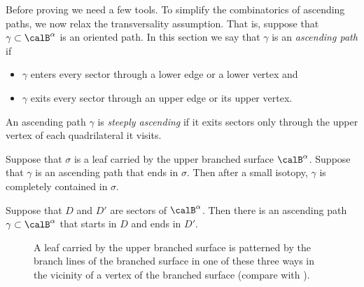 \documentclass[12pt]{amsart}
\begin{document}
Before proving  we need a few tools. To simplify the combinatorics of ascending paths, we now relax the transversality assumption. That is, suppose that $\gamma \subset \calB^\alpha$ is an oriented path. In this section we say that $\gamma$ is an \emph{ascending path} if 
\begin{itemize}
\item
$\gamma$ enters every sector through a lower edge or a lower vertex and 
\item
$\gamma$ exits every sector through an upper edge or its upper vertex.
\end{itemize}
An ascending path $\gamma$ is \emph{steeply ascending} if it exits sectors only through the upper vertex of each quadrilateral it visits. 

\begin{remark}
\label{Rem:Ascend}
Suppose that $\sigma$ is a leaf carried by the upper branched surface $\calB^\alpha$. Suppose that $\gamma$ is an ascending path that ends in $\sigma$. Then after a small isotopy, $\gamma$ is completely contained in $\sigma$.
\end{remark}

\begin{lemma}
\label{Lem:Transitive}
Suppose that $D$ and $D'$ are sectors of $\calB^\alpha$.  Then there is an ascending path $\gamma \subset \calB^\alpha$ that starts in $D$ and ends in $D'$.  
\end{lemma}

\begin{figure}[htb]
\centering
{}
\caption{A leaf carried by the upper branched surface is patterned by the branch lines of the branched surface in one of these three ways in the vicinity of a vertex of the branched surface (compare with ).}
\label{Fig:LambdasAndX}
\end{figure}
\end{document}
